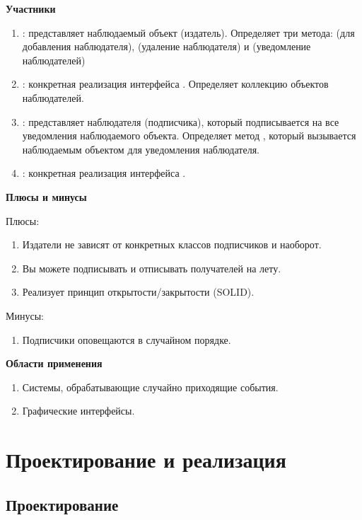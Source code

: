 \documentclass[PI,LAB]{HSEUniversity}
\begin{document}
\textbf{Участники}

\begin{enumerate}
  \item {}: представляет наблюдаемый объект (издатель). Определяет три метода:  (для добавления наблюдателя),  (удаление наблюдателя) и  (уведомление наблюдателей)
  \item {}: конкретная реализация интерфейса . Определяет коллекцию объектов наблюдателей.
  \item {}: представляет наблюдателя (подписчика), который подписывается на все уведомления наблюдаемого объекта. Определяет метод , который вызывается наблюдаемым объектом для уведомления наблюдателя.
  \item {}: конкретная реализация интерфейса .
\end{enumerate}

\textbf{Плюсы и минусы}

Плюсы:
\begin{enumerate}
	\item Издатели не зависят от конкретных классов подписчиков и наоборот.
  \item Вы можете подписывать и отписывать получателей на лету.
  \item Реализует принцип открытости/закрытости (SOLID).
\end{enumerate}

Минусы:
\begin{enumerate}
	\item Подписчики оповещаются в случайном порядке.
\end{enumerate}

\textbf{Области применения}

\begin{enumerate}
	\item Системы, обрабатывающие случайно приходящие события.
	\item Графические интерфейсы.
\end{enumerate}

\chapter{Проектирование и реализация}
\section{Проектирование}
\end{document}
